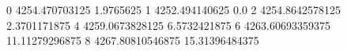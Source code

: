 0 4254.470703125 1.9765625
1 4252.494140625 0.0
2 4254.8642578125 2.3701171875
4 4259.0673828125 6.5732421875
6 4263.60693359375 11.11279296875
8 4267.80810546875 15.31396484375
